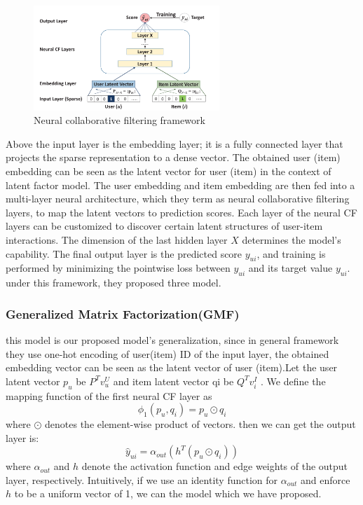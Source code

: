 \documentclass{acmtog} %
\begin{document}
\begin{figure}[htbp]
	\centering
	\includegraphics[width=7cm]{pa3}
	\caption{Neural collaborative filtering framework}
	\label{fig:pa3}
\end{figure}

Above the input layer is the embedding layer; it is a fully connected layer that projects the sparse representation to a dense vector. The obtained user (item) embedding can be seen as the latent vector for user (item) in the context of latent factor model. The user embedding and item embedding are then fed into a multi-layer neural architecture, which they term as neural collaborative filtering layers, to map the latent vectors to prediction scores. Each layer of the neural CF layers can be customized to discover certain latent structures of user-item interactions. The dimension of the last hidden layer $X$ determines the model’s capability. The final output layer is the predicted score $y_{ui}$, and training is performed by minimizing the pointwise loss between $y_{ui}$ and its target value $y_{ui}$. under this framework, they proposed three model.

\subsubsection{Generalized Matrix Factorization(GMF)}
this model is our proposed model's generalization, since in general framework they use one-hot encoding of user(item) ID of the input layer, the obtained embedding vector can be seen as the latent vector of user (item).Let the user latent vector $p_u$ be $P^T v^U_u$ and item latent vector qi be $Q^T v^I_i$ . We define the mapping function of the first neural CF layer as
\begin{equation}
	\phi_1(p_u,q_i)=p_u\odot q_i
\end{equation}
where $\odot$ denotes the element-wise product of vectors. then we can get the output layer is:
\begin{equation}
	\hat y_{ui}=\alpha_{out}(h^T(p_u\odot q_i))
\end{equation}
where $\alpha_{out}$ and $h$ denote the activation function and edge weights of the output layer, respectively. Intuitively, if we use an identity function for $\alpha_{out}$ and enforce $h$ to be a uniform vector of 1, we can the model which we have proposed.
\end{document}
